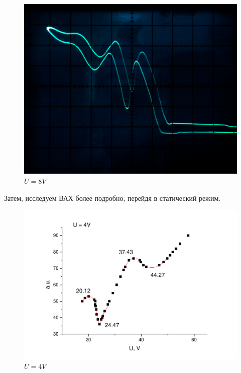 \documentclass[a4paper,12pt]{article}
\begin{document}
\begin{figure}[h!]
\begin{center}
\begin{minipage}{0.3\textwidth}
						\includegraphics[width=\textwidth]{8}
						\caption{$U = 8V$}
					\end{minipage}
			\end{center}
		\end{figure}
		
		Затем, исследуем ВАХ более подробно, перейдя в статический режим.
		\begin{figure}[h!]
			\includegraphics[width=0.95\linewidth]{4V}
			\caption{$U = 4V$}
		\end{figure}
		
\end{document}
